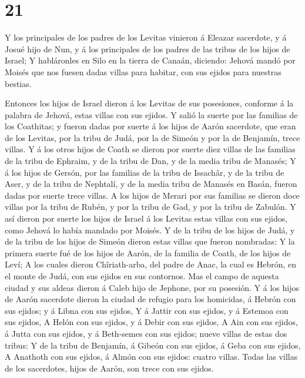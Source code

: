 \hypertarget{section-20}{%
\section{21}\label{section-20}}

 Y los principales de los padres de los Levitas vinieron á
Eleazar sacerdote, y á Josué hijo de Nun, y á los principales de los
padres de las tribus de los hijos de Israel;  Y habláronles
en Silo en la tierra de Canaán, diciendo: Jehová mandó por Moisés que
nos fuesen dadas villas para habitar, con sus ejidos para nuestras
bestias.

 Entonces los hijos de Israel dieron á los Levitas de sus
posesiones, conforme á la palabra de Jehová, estas villas con sus
ejidos.  Y salió la suerte por las familias de los
Coathitas; y fueron dadas por suerte á los hijos de Aarón sacerdote, que
eran de los Levitas, por la tribu de Judá, por la de Simeón y por la de
Benjamín, trece villas.  Y á los otros hijos de Coath se
dieron por suerte diez villas de las familias de la tribu de Ephraim, y
de la tribu de Dan, y de la media tribu de Manasés;  Y á los
hijos de Gersón, por las familias de la tribu de Issachâr, y de la tribu
de Aser, y de la tribu de Nephtalí, y de la media tribu de Manasés en
Basán, fueron dadas por suerte trece villas.  A los hijos de
Merari por sus familias se dieron doce villas por la tribu de Rubén, y
por la tribu de Gad, y por la tribu de Zabulón.  Y así
dieron por suerte los hijos de Israel á los Levitas estas villas con sus
ejidos, como Jehová lo había mandado por Moisés.  Y de la
tribu de los hijos de Judá, y de la tribu de los hijos de Simeón dieron
estas villas que fueron nombradas:  Y la primera suerte fué
de los hijos de Aarón, de la familia de Coath, de los hijos de Leví;
 A los cuales dieron Chîriath-arba, del padre de Anac, la
cual es Hebrón, en el monte de Judá, con sus ejidos en sus contornos.
 Mas el campo de aquesta ciudad y sus aldeas dieron á Caleb
hijo de Jephone, por su posesión.  Y á los hijos de Aarón
sacerdote dieron la ciudad de refugio para los homicidas, á Hebrón con
sus ejidos; y á Libna con sus ejidos,  Y á Jattir con sus
ejidos, y á Estemoa con sus ejidos,  A Helón con sus
ejidos, y á Debir con sus ejidos,  A Ain con sus ejidos, á
Jutta con sus ejidos, y á Beth-semes con sus ejidos; nueve villas de
estas dos tribus:  Y de la tribu de Benjamín, á Gibeón con
sus ejidos, á Geba con sus ejidos,  A Anathoth con sus
ejidos, á Almón con sus ejidos: cuatro villas.  Todas las
villas de los sacerdotes, hijos de Aarón, son trece con sus ejidos.

